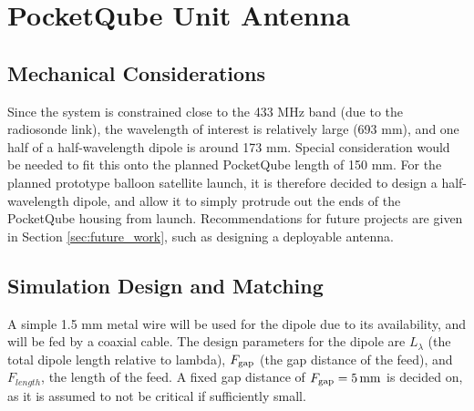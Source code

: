 \graphicspath{{./figures}}

\section{PocketQube Unit Antenna}
\subsection{Mechanical Considerations}
Since the system is constrained close to the 433 MHz band (due to the radiosonde link), the wavelength of interest is relatively large (693 mm), and one half of a half-wavelength dipole is around 173 mm. Special consideration would be needed to fit this onto the planned PocketQube length of 150 mm. For the planned prototype balloon satellite launch, it is therefore decided to design a half-wavelength dipole, and allow it to simply protrude out the ends of the PocketQube housing from launch. Recommendations for future projects are given in Section \ref{sec:future_work}, such as designing a deployable antenna.

\subsection{Simulation Design and Matching}
A simple 1.5 mm metal wire will be used for the dipole due to its availability, and will be fed by a coaxial cable. The design parameters for the dipole are $L_\lambda$ (the total dipole length relative to lambda), $F_{\textnormal{gap}}$ (the gap distance of the feed), and $F_{length}$, the length of the feed. A fixed gap distance of $F_{\textnormal{gap}} = \SI{5}{mm}$ is decided on, as it is assumed to not be critical if sufficiently small.

